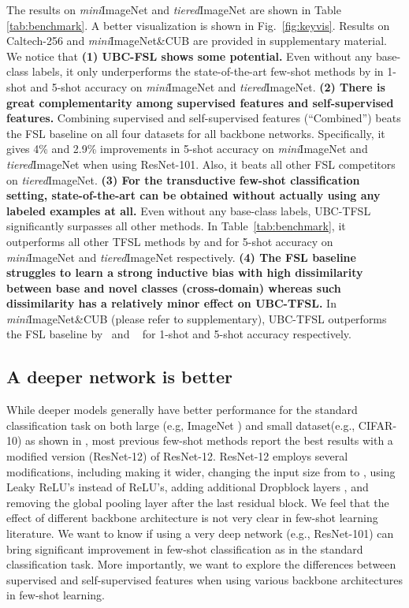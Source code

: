 \documentclass[final]{cvpr}
\newcommand{\subsecvspace}{\vspace{-0.0em}}
\begin{document}
The results on \emph{mini}ImageNet and \emph{tiered}ImageNet are shown in Table \ref{tab:benchmark}. A better visualization is shown in Fig.~\ref{fig:keyvis}. Results on Caltech-256 and \emph{mini}ImageNet\&CUB are provided in supplementary material.
We notice that \textbf{(1) UBC-FSL shows some potential.} Even without any base-class labels, it only underperforms the state-of-the-art few-shot methods by  in 1-shot and 5-shot accuracy on \emph{mini}ImageNet and \emph{tiered}ImageNet. 
\textbf{(2) There is great complementarity among supervised features and self-supervised features.} 
Combining supervised and self-supervised features (``Combined'') beats the FSL baseline on all four datasets for all backbone networks. Specifically, it gives 4\% and 2.9\% improvements in 5-shot accuracy on \emph{mini}ImageNet and \emph{tiered}ImageNet when using ResNet-101. Also, it beats all other FSL competitors on \emph{tiered}ImageNet.
\textbf{(3) For the transductive few-shot classification setting, state-of-the-art can be obtained without actually using any labeled examples at all.} Even without any base-class labels, UBC-TFSL significantly surpasses all other methods. 
In Table~\ref{tab:benchmark}, it outperforms all other TFSL methods by  and  for 5-shot accuracy on \emph{mini}ImageNet and \emph{tiered}ImageNet respectively. 
\textbf{(4) The FSL baseline struggles to learn a strong inductive bias with high dissimilarity between base and novel classes (cross-domain) whereas such dissimilarity has a relatively minor effect on UBC-TFSL.} In \emph{mini}ImageNet\&CUB (please refer to supplementary), UBC-TFSL outperforms the FSL baseline by~ and ~ for 1-shot and 5-shot accuracy respectively.



\subsecvspace
\subsection{A deeper network is better}
\subsecvspace
\label{arch}



While deeper models generally have better performance for the standard classification task on both large (e.g, ImageNet \cite{deng2009imagenet}) and small dataset(e.g., CIFAR-10) as shown in \cite{he2015deep}, most previous few-shot methods \cite{tian2020rethinking,lee2019meta} report the best results with a modified version (ResNet-12) of ResNet-12\cite{he2015deep}.
ResNet-12 employs several modifications, including making it  wider, changing the input size from  to , using Leaky ReLU's instead of ReLU's, adding additional Dropblock layers \cite{ghiasi2018dropblock}, and removing the global pooling layer after the last residual block. 
We feel that the effect of different backbone architecture is not very clear in few-shot learning literature. We want to know if using a very deep network (e.g., ResNet-101) can bring significant improvement in few-shot classification as in the standard classification task.
More importantly, we want to explore the differences between supervised and self-supervised features when using various backbone architectures in few-shot learning.
\end{document}
